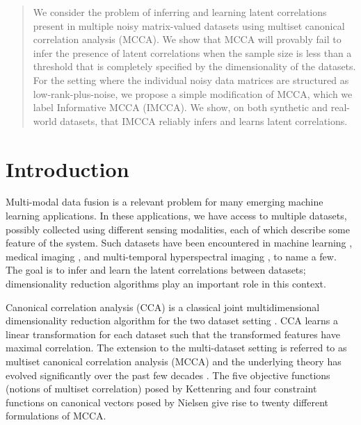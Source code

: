 \begin{abstract}
  We consider the problem of inferring and learning latent correlations present in
  multiple noisy matrix-valued datasets using multiset canonical correlation analysis
  (MCCA). We show that MCCA will provably fail to infer the presence of latent
  correlations when the sample size is less than a threshold that is completely specified
  by the dimensionality of the datasets. For the setting where the individual noisy data
  matrices are structured as low-rank-plus-noise, we propose a simple modification of
  MCCA, which we label Informative MCCA (IMCCA).  We show, on both synthetic and real-world
  datasets, that IMCCA reliably infers and learns latent correlations.
\end{abstract}

\section{Introduction}\label{sec:intro}
Multi-modal data fusion is a relevant problem for many emerging machine learning
applications. In these applications, we have access to multiple datasets, possibly
collected using different sensing modalities, each of which describe some feature of the
system. Such datasets have been encountered in machine learning
\cite{hardoon2004canonical, dhillon2011multi ,ahsan2014clustering,chaudhuri2009multi},
medical imaging \cite{correa2010canonical,
  deleus2011functional,zhang2014frequency,guccione2013functional,chen2014removal}, and
multi-temporal hyperspectral imaging \cite{nielsen2002multiset}, to name a few. The goal
is to infer and learn the latent correlations between datasets; dimensionality
reduction algorithms play an important role in this context.

Canonical correlation analysis (CCA) is a classical joint multidimensional dimensionality
reduction algorithm for the two dataset setting \cite{hotelling1936relations}. CCA learns
a linear transformation for each dataset such that the transformed features have maximal
correlation. The extension to the multi-dataset setting is referred to as multiset
canonical correlation analysis (MCCA) and the underlying theory has evolved significantly
over the past few decades \cite{vinograde1950canonical,steel1951minimum,
  horst1961generalized,kettenring1971canonical,nielsen1994analysis}. The five objective
functions (notions of multiset correlation) posed by Kettenring and four constraint
functions on canonical vectors posed by Nielsen give rise to twenty different formulations
of MCCA.

